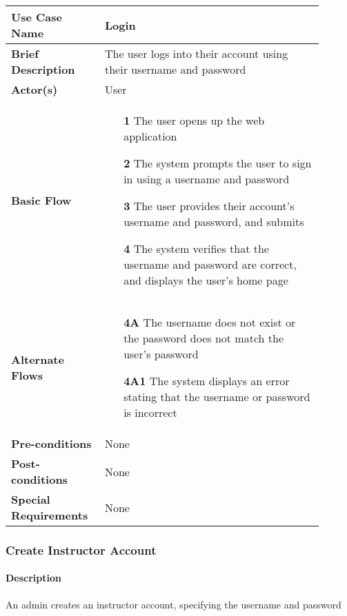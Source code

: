 \documentclass{article}
\begin{document}
\vspace{0.1in}

\begin{tabular}{| p{0.25\linewidth} | p{0.65\linewidth} |}
  \hline
  \textbf{Use Case Name} & Login \\
  \hline
  \textbf{Brief Description} & The user logs into their account using their username and password \\
  \hline
  \textbf{Actor(s)} & User \\
  \hline
  \textbf{Basic Flow} & \begin{itemize}
    \item[\textbf{1}] The user opens up the web application
    \item[\textbf{2}] The system prompts the user to sign in using a username and password
    \item[\textbf{3}] The user provides their account's username and password, and submits
    \item[\textbf{4}] The system verifies that the username and password are correct, and displays the user's home page
  \end{itemize}\\
  \hline
  \textbf{Alternate Flows} & \begin{itemize}
    \item[\textbf{4A}] The username does not exist or the password does not match the user's password
    \item[\textbf{4A1}] The system displays an error stating that the username or password is incorrect
  \end{itemize} \\
  \hline
  \textbf{Pre-conditions} & None\\
  \hline
  \textbf{Post-conditions} & None \\
  \hline
  \textbf{Special Requirements} & None \\
  \hline
\end{tabular}

\subsubsection{Create Instructor Account}

\paragraph{Description} An admin creates an instructor account, specifying the username and password
\end{document}
